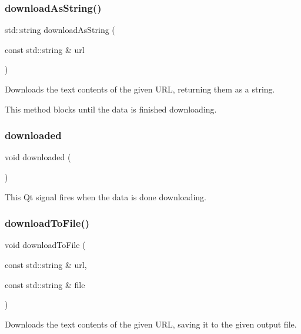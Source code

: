 \subsubsection{\texorpdfstring{download\+As\+String()}{downloadAsString()}}
{\footnotesize\ttfamily std\+::string download\+As\+String (\begin{DoxyParamCaption}\item[{const std\+::string \&}]{url }\end{DoxyParamCaption})}



Downloads the text contents of the given U\+RL, returning them as a string. 

This method blocks until the data is finished downloading. \mbox{\label{classGDownloader_abb5cf1dbe464e3dc8943c261934b9a64}} 
\subsubsection{\texorpdfstring{downloaded}{downloaded}}
{\footnotesize\ttfamily void downloaded (\begin{DoxyParamCaption}{ }\end{DoxyParamCaption})\hspace{0.3cm}{\ttfamily [signal]}}



This Qt signal fires when the data is done downloading. 

\mbox{\label{classGDownloader_a0bf57f044cc66c8aab40f3f2179caf21}} 
\subsubsection{\texorpdfstring{download\+To\+File()}{downloadToFile()}}
{\footnotesize\ttfamily void download\+To\+File (\begin{DoxyParamCaption}\item[{const std\+::string \&}]{url,  }\item[{const std\+::string \&}]{file }\end{DoxyParamCaption})}



Downloads the text contents of the given U\+RL, saving it to the given output file. 

